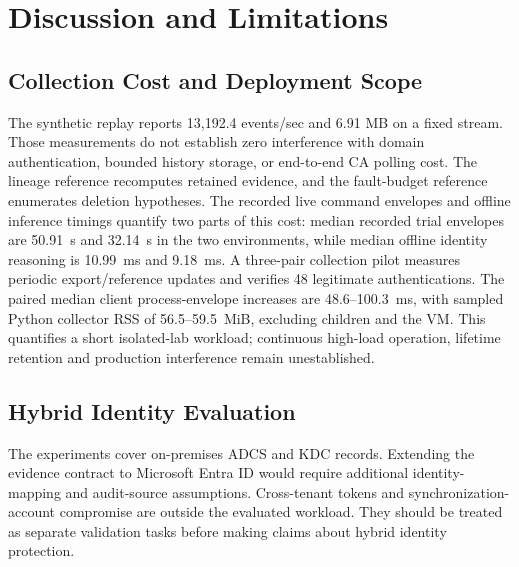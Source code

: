 \section{Discussion and Limitations}
\label{sec:discussion}
\subsection{Collection Cost and Deployment Scope}
The synthetic replay reports 13,192.4 events/sec and 6.91 MB on a fixed stream. Those measurements do not establish zero interference with domain authentication, bounded history storage, or end-to-end CA polling cost. The lineage reference recomputes retained evidence, and the fault-budget reference enumerates deletion hypotheses. The recorded live command envelopes and offline inference timings quantify two parts of this cost: median recorded trial envelopes are 50.91~s and 32.14~s in the two environments, while median offline identity reasoning is 10.99~ms and 9.18~ms. A three-pair collection pilot measures periodic export/reference updates and verifies 48 legitimate authentications. The paired median client process-envelope increases are 48.6--100.3~ms, with sampled Python collector RSS of 56.5--59.5~MiB, excluding children and the VM. This quantifies a short isolated-lab workload; continuous high-load operation, lifetime retention and production interference remain unestablished.

\subsection{Hybrid Identity Evaluation}
The experiments cover on-premises ADCS and KDC records. Extending the evidence contract to Microsoft Entra ID would require additional identity-mapping and audit-source assumptions. Cross-tenant tokens and synchronization-account compromise are outside the evaluated workload. They should be treated as separate validation tasks before making claims about hybrid identity protection.

